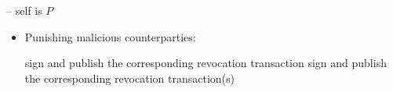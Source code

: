 \begin{center}
\begin{processbox}{\pchan -- self is $P$}
\begin{itemize}
      \item Punishing malicious counterparties:
      \begin{algorithmic}[0]
        \State {}
          \State sign and publish the corresponding revocation transaction
        \EndIf
          \State sign and publish the corresponding revocation transaction(s)
        \EndIf
      \end{algorithmic}
    \end{itemize}
  \end{processbox}
  \label{code:pseudocode}
\end{center} \ \\
